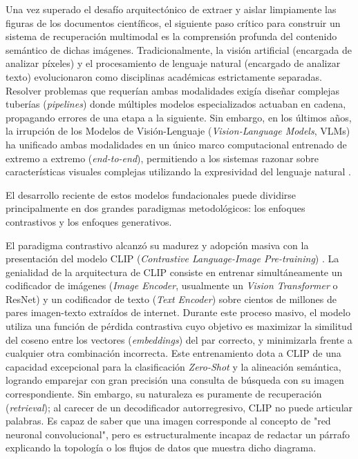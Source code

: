 \documentclass[a4paper]{report}
\begin{document}
Una vez superado el desafío arquitectónico de extraer y aislar limpiamente las figuras de los documentos científicos, el siguiente paso crítico para construir un sistema de recuperación multimodal es la comprensión profunda del contenido semántico de dichas imágenes. Tradicionalmente, la visión artificial (encargada de analizar píxeles) y el procesamiento de lenguaje natural (encargado de analizar texto) evolucionaron como disciplinas académicas estrictamente separadas. Resolver problemas que requerían ambas modalidades exigía diseñar complejas tuberías (\textit{pipelines}) donde múltiples modelos especializados actuaban en cadena, propagando errores de una etapa a la siguiente. Sin embargo, en los últimos años, la irrupción de los Modelos de Visión-Lenguaje (\textit{Vision-Language Models}, VLMs) ha unificado ambas modalidades en un único marco computacional entrenado de extremo a extremo (\textit{end-to-end}), permitiendo a los sistemas razonar sobre características visuales complejas utilizando la expresividad del lenguaje natural \cite{radford2021learning}.

El desarrollo reciente de estos modelos fundacionales puede dividirse principalmente en dos grandes paradigmas metodológicos: los enfoques contrastivos y los enfoques generativos.

El paradigma contrastivo alcanzó su madurez y adopción masiva con la presentación del modelo CLIP (\textit{Contrastive Language-Image Pre-training}) \cite{radford2021learning}. La genialidad de la arquitectura de CLIP consiste en entrenar simultáneamente un codificador de imágenes (\textit{Image Encoder}, usualmente un \textit{Vision Transformer} o ResNet) y un codificador de texto (\textit{Text Encoder}) sobre cientos de millones de pares imagen-texto extraídos de internet. Durante este proceso masivo, el modelo utiliza una función de pérdida contrastiva cuyo objetivo es maximizar la similitud del coseno entre los vectores (\textit{embeddings}) del par correcto, y minimizarla frente a cualquier otra combinación incorrecta. Este entrenamiento dota a CLIP de una capacidad excepcional para la clasificación \textit{Zero-Shot} y la alineación semántica, logrando emparejar con gran precisión una consulta de búsqueda con su imagen correspondiente. Sin embargo, su naturaleza es puramente de recuperación (\textit{retrieval}); al carecer de un decodificador autorregresivo, CLIP no puede articular palabras. Es capaz de saber que una imagen corresponde al concepto de "red neuronal convolucional", pero es estructuralmente incapaz de redactar un párrafo explicando la topología o los flujos de datos que muestra dicho diagrama.
\end{document}
